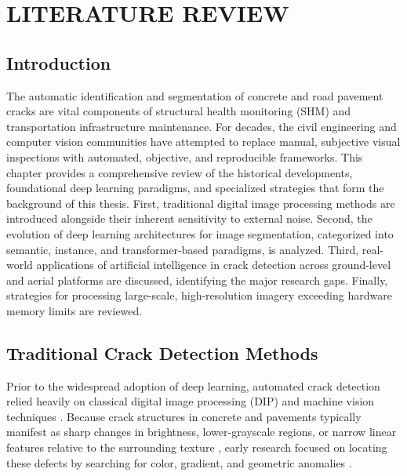 \chapter{LITERATURE REVIEW}

\section{Introduction}

\hs The automatic identification and segmentation of concrete and road pavement cracks are vital components of structural health monitoring (SHM) and transportation infrastructure maintenance. For decades, the civil engineering and computer vision communities have attempted to replace manual, subjective visual inspections with automated, objective, and reproducible frameworks. This chapter provides a comprehensive review of the historical developments, foundational deep learning paradigms, and specialized strategies that form the background of this thesis. First, traditional digital image processing methods are introduced alongside their inherent sensitivity to external noise. Second, the evolution of deep learning architectures for image segmentation, categorized into semantic, instance, and transformer-based paradigms, is analyzed. Third, real-world applications of artificial intelligence in crack detection across ground-level and aerial platforms are discussed, identifying the major research gaps. Finally, strategies for processing large-scale, high-resolution imagery exceeding hardware memory limits are reviewed.

\section{Traditional Crack Detection Methods}

\hs Prior to the widespread adoption of deep learning, automated crack detection relied heavily on classical digital image processing (DIP) and machine vision techniques \cite{zhang-2024a}. Because crack structures in concrete and pavements typically manifest as sharp changes in brightness, lower-grayscale regions, or narrow linear features relative to the surrounding texture \cite{zhen-liang-2025,liu-2019}, early research focused on locating these defects by searching for color, gradient, and geometric anomalies \cite{zhen-liang-2025}.

